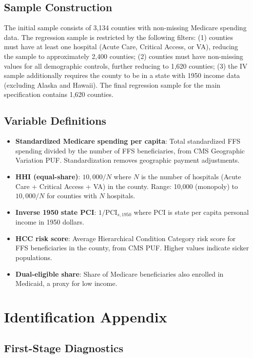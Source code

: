 \documentclass[12pt]{article}
\begin{document}
\subsection{Sample Construction}

The initial sample consists of 3,134 counties with non-missing Medicare spending data. The regression sample is restricted by the following filters: (1) counties must have at least one hospital (Acute Care, Critical Access, or VA), reducing the sample to approximately 2,400 counties; (2) counties must have non-missing values for all demographic controls, further reducing to 1,620 counties; (3) the IV sample additionally requires the county to be in a state with 1950 income data (excluding Alaska and Hawaii). The final regression sample for the main specification contains 1,620 counties.

\subsection{Variable Definitions}

\begin{itemize}
\item \textbf{Standardized Medicare spending per capita}: Total standardized FFS spending divided by the number of FFS beneficiaries, from CMS Geographic Variation PUF. Standardization removes geographic payment adjustments.
\item \textbf{HHI (equal-share)}: $10{,}000 / N$ where $N$ is the number of hospitals (Acute Care + Critical Access + VA) in the county. Range: 10,000 (monopoly) to $10{,}000/N$ for counties with $N$ hospitals.
\item \textbf{Inverse 1950 state PCI}: $1 / \text{PCI}_{s,1950}$ where PCI is state per capita personal income in 1950 dollars.
\item \textbf{HCC risk score}: Average Hierarchical Condition Category risk score for FFS beneficiaries in the county, from CMS PUF. Higher values indicate sicker populations.
\item \textbf{Dual-eligible share}: Share of Medicare beneficiaries also enrolled in Medicaid, a proxy for low income.
\end{itemize}

\section{Identification Appendix}
\label{app:identification}

\subsection{First-Stage Diagnostics}
\end{document}
